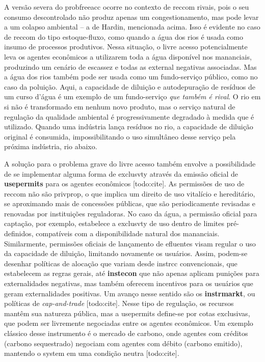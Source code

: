 \documentclass[./main.tex]{subfiles}
\begin{document}
\par A versão severa do \gls{probfreeacc} ocorre no contexto de \gls{reccom} rivais, pois o seu consumo descontrolado não produz apenas um congestionamento, mas pode levar a um colapso ambiental -- a  de Hardin, mencionada acima. Isso é evidente no caso de \gls{reccom} do tipo estoque-fluxo, como quando a água dos rios é usada como insumo de processos produtivos. Nessa situação, o livre acesso potencialmente leva os agentes econômicos a utilizarem toda a água disponível nos mananciais, produzindo um cenário de escassez e todas as \gls{external} negativas associadas. Mas a água dos rios também pode ser usada como um fundo-serviço público, como no caso da poluição. Aqui, a capacidade de diluição e autodepuração de resíduos de um curso d'água é um exemplo de um fundo-serviço \textit{que também é rival}. O rio em si não é transformado em nenhum novo produto, mas o serviço natural de regulação da qualidade ambiental é progressivamente degradado à medida que é utilizado. Quando uma indústria lança resíduos no rio, a capacidade de diluição original é consumida, impossibilitando o uso simultâneo desse serviço pela próxima indústria, rio abaixo. 

\par A solução para o problema grave do livre acesso também envolve a possibilidade de se implementar alguma forma de \gls{exclusvty} através da emissão oficial de \textbf{\gls{usepermits}} para os agentes econômicos [todo:cite]. As permissões de uso de \gls{reccom} não são \gls{privprop}, o que implica um direito de uso vitalício e hereditário, se aproximando mais de concessões públicas, que são periodicamente revisadas e renovadas por instituições reguladoras. No caso da água, a permissão oficial para captação, por exemplo, estabelece a \gls{exclusvty} de uso dentro de limites pré-definidos, compatíveis com a disponibilidade natural dos mananciais. Similarmente, permissões oficiais de lançamento de efluentes visam regular o uso da capacidade de diluição, limitando novamente os usuários. Assim, podem-se desenhar políticas de alocação que variam desde \gls{instrcc} convencionais, que estabelecem as regras gerais, até \textbf{\gls{instecon}} que não apenas aplicam punições para externalidades negativas, mas também oferecem incentivos para os usuários que geram externalidades positivas. Um avanço nesse sentido são os \textbf{\gls{instrmarkt}}, ou políticas de \textit{cap-and-trade} [todo:cite]. Nesse tipo de regulação, os recursos mantêm sua natureza pública, mas a \gls{usepermits} define-se por cotas exclusivas, que podem ser livremente negociadas entre os agentes econômicos. Um exemplo clássico desse instrumento é o mercado de carbono, onde agentes com créditos (carbono sequestrado) negociam com agentes com débito (carbono emitido), mantendo o \gls{system} em uma condição neutra [todo:cite].
\end{document}
